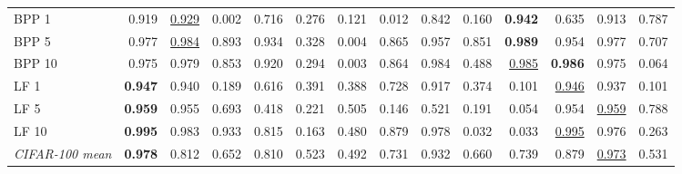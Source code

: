 \begin{table}[htbp]
\begin{adjustbox}{max width=\linewidth}
\begin{tabular}{lrrrrrrrrrrrrr}
BPP 1 & 0.919 & \underline{0.929} & \textcolor{black!45}{0.002} & 0.716 & \textcolor{black!45}{0.276} & \textcolor{black!45}{0.121} & \textcolor{black!45}{0.012} & 0.842 & \textcolor{black!45}{0.160} & \textbf{0.942} & 0.635 & 0.913 & 0.787 \\
BPP 5 & 0.977 & \underline{0.984} & 0.893 & 0.934 & \textcolor{black!45}{0.328} & \textcolor{black!45}{0.004} & 0.865 & 0.957 & 0.851 & \textbf{0.989} & 0.954 & 0.977 & 0.707 \\
BPP 10 & 0.975 & 0.979 & 0.853 & 0.920 & \textcolor{black!45}{0.294} & \textcolor{black!45}{0.003} & 0.864 & 0.984 & \textcolor{black!45}{0.488} & \underline{0.985} & \textbf{0.986} & 0.975 & \textcolor{black!45}{0.064} \\
LF 1 & \textbf{0.947} & 0.940 & \textcolor{black!45}{0.189} & 0.616 & \textcolor{black!45}{0.391} & \textcolor{black!45}{0.388} & 0.728 & 0.917 & \textcolor{black!45}{0.374} & \textcolor{black!45}{0.101} & \underline{0.946} & 0.937 & \textcolor{black!45}{0.101} \\
LF 5 & \textbf{0.959} & 0.955 & 0.693 & \textcolor{black!45}{0.418} & \textcolor{black!45}{0.221} & 0.505 & \textcolor{black!45}{0.146} & 0.521 & \textcolor{black!45}{0.191} & \textcolor{black!45}{0.054} & 0.954 & \underline{0.959} & 0.788 \\
LF 10 & \textbf{0.995} & 0.983 & 0.933 & 0.815 & \textcolor{black!45}{0.163} & \textcolor{black!45}{0.480} & 0.879 & 0.978 & \textcolor{black!45}{0.032} & \textcolor{black!45}{0.033} & \underline{0.995} & 0.976 & \textcolor{black!45}{0.263} \\
\rowcolor{black!8}\emph{CIFAR-100 mean} & \textbf{0.978} & 0.812 & 0.652 & 0.810 & 0.523 & \textcolor{black!45}{0.492} & 0.731 & 0.932 & 0.660 & 0.739 & 0.879 & \underline{0.973} & 0.531 \\
\bottomrule
\end{tabular}
\end{adjustbox}
\end{table}
